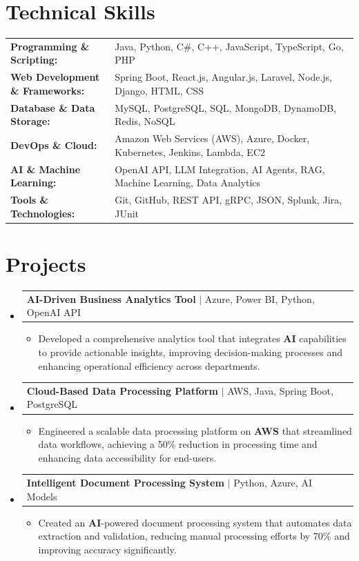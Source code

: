 \documentclass[letterpaper,10pt]{article}
\makeatletter
\newcommand{\resumeItem}[1]{
  \item{\fontsize{8pt}{9pt}\selectfont
    #1 \vspace{-3pt}
  }
}
\newcommand{\resumeProjectHeading}[2]{
    \item
    \begin{tabular*}{1.001\textwidth}{l@{\extracolsep{\fill}}r}
      \fontsize{8.5pt}{10pt}#1 & \textbf{\fontsize{8.5pt}{10pt} #2}\\
    \end{tabular*}\vspace{-7pt}
}
\newcommand{\resumeSubHeadingListStart}{\begin{itemize}[leftmargin=0pt, label={}]}
\newcommand{\resumeSubHeadingListEnd}{\end{itemize}}
\newcommand{\resumeItemListStart}{\begin{itemize}[leftmargin=*]}
\newcommand{\resumeItemListEnd}{\end{itemize}\vspace{-5pt}}
\makeatother
\begin{document}
\section{Technical Skills}
        \vspace{-14pt}
        \begin{table}[h]
            \fontsize{8pt}{9pt}\selectfont
            \begin{tabular}{p{0.3\linewidth} p{0.7\linewidth}}
                \textbf{Programming \& Scripting:} & Java, Python, C\#, C++, JavaScript, TypeScript, Go, PHP \\
                \textbf{Web Development \& Frameworks:} & Spring Boot, React.js, Angular.js, Laravel, Node.js, Django, HTML, CSS \\
                \textbf{Database \& Data Storage:} & MySQL, PostgreSQL, SQL, MongoDB, DynamoDB, Redis, NoSQL \\
                \textbf{DevOps \& Cloud:} & Amazon Web Services (AWS), Azure, Docker, Kubernetes, Jenkins, Lambda, EC2 \\
                \textbf{AI \& Machine Learning:} & OpenAI API, LLM Integration, AI Agents, RAG, Machine Learning, Data Analytics \\
                \textbf{Tools \& Technologies:} & Git, GitHub, REST API, gRPC, JSON, Splunk, Jira, JUnit \\
            \end{tabular}
        \end{table}
 \vspace{-18pt}

\section{Projects}
    \vspace{-5pt}
    \resumeSubHeadingListStart
          \resumeProjectHeading
            {\textbf{AI-Driven Business Analytics Tool} $|$ Azure, Power BI, Python, OpenAI API}{}
            \resumeItemListStart
                \resumeItem{Developed a comprehensive analytics tool that integrates \textbf{AI} capabilities to provide actionable insights, improving decision-making processes and enhancing operational efficiency across departments.}
            \resumeItemListEnd
        \vspace{-12pt}
    
        \resumeProjectHeading
            {\textbf{Cloud-Based Data Processing Platform} $|$ AWS, Java, Spring Boot, PostgreSQL}{}
        \resumeItemListStart
                \resumeItem{Engineered a scalable data processing platform on \textbf{AWS} that streamlined data workflows, achieving a 50\% reduction in processing time and enhancing data accessibility for end-users.}
        \resumeItemListEnd
      \vspace{-12pt}
      \resumeProjectHeading
        {\textbf{Intelligent Document Processing System} $|$ Python, Azure, AI Models}{}
    \resumeItemListStart
            \resumeItem{Created an \textbf{AI}-powered document processing system that automates data extraction and validation, reducing manual processing efforts by 70\% and improving accuracy significantly.}
    \resumeItemListEnd
    \resumeSubHeadingListEnd
\end{document}
